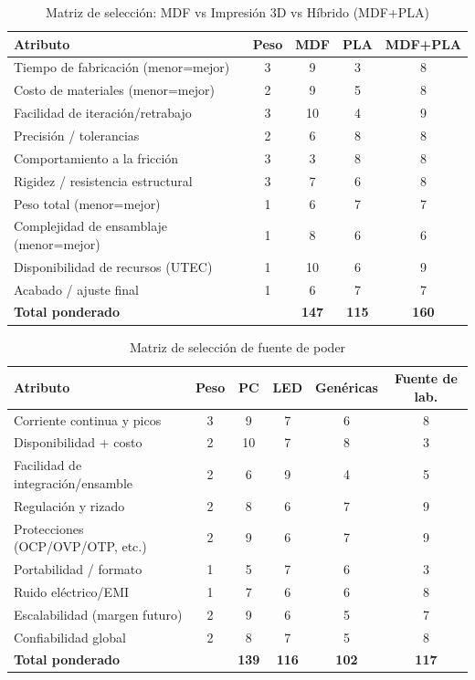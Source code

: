 \documentclass[11pt,a4paper]{article}
\begin{document}
\begin{table}[H]
\centering
\caption{Matriz de selección: MDF vs Impresión 3D vs Híbrido (MDF+PLA)}
\begin{tabular}{lcccc}
\toprule
\textbf{Atributo} & \textbf{Peso} & \textbf{MDF} & \textbf{PLA} & \textbf{MDF+PLA} \\
\midrule
Tiempo de fabricación (menor=mejor) & 3 & 9 & 3 & 8 \\
Costo de materiales (menor=mejor)   & 2 & 9 & 5 & 8 \\
Facilidad de iteración/retrabajo    & 3 & 10 & 4 & 9 \\
Precisión / tolerancias              & 2 & 6 & 8 & 8 \\
Comportamiento a la fricción         & 3 & 3 & 8 & 8 \\
Rigidez / resistencia estructural    & 3 & 7 & 6 & 8 \\
Peso total (menor=mejor)             & 1 & 6 & 7 & 7 \\
Complejidad de ensamblaje (menor=mejor) & 1 & 8 & 6 & 6 \\
Disponibilidad de recursos (UTEC)    & 1 & 10 & 6 & 9 \\
Acabado / ajuste final               & 1 & 6 & 7 & 7 \\
\midrule
\textbf{Total ponderado}             &    & \textbf{147} & \textbf{115} & \textbf{160} \\
\bottomrule
\end{tabular}
\end{table}

\begin{table}[H]
\centering
\caption{Matriz de selección de fuente de poder}
\begin{tabular}{lccccc}
\toprule
\textbf{Atributo} & \textbf{Peso} & \textbf{PC} & \textbf{LED} & \textbf{Genéricas} & \textbf{Fuente de lab.} \\
\midrule
Corriente continua y picos         & 3 & 9 & 7 & 6 & 8 \\
Disponibilidad + costo             & 2 & 10 & 7 & 8 & 3 \\
Facilidad de integración/ensamble  & 2 & 6 & 9 & 4 & 5 \\
Regulación y rizado                & 2 & 8 & 6 & 7 & 9 \\
Protecciones (OCP/OVP/OTP, etc.)   & 2 & 9 & 6 & 7 & 9 \\
Portabilidad / formato             & 1 & 5 & 7 & 6 & 3 \\
Ruido eléctrico/EMI                & 1 & 7 & 6 & 6 & 8 \\
Escalabilidad (margen futuro)      & 2 & 9 & 6 & 5 & 7 \\
Confiabilidad global               & 2 & 8 & 7 & 5 & 8 \\
\midrule
\textbf{Total ponderado}           &   & \textbf{139} & \textbf{116} & \textbf{102} & \textbf{117} \\
\bottomrule
\end{tabular}
\end{table}
\end{document}
